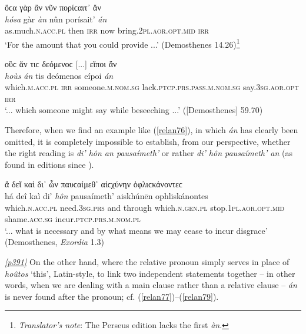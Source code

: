 \begin{exe}
\ex ὅϲα γὰρ ἂν νῦν πορίϲαιτ᾽ ἄν\\
\gll \emph{hósa} gàr \emph{àn} nûn porísait' \emph{án}\\
as.much.\textsc{n.acc.pl} then \textsc{irr} now bring.\textsc{2pl.aor.opt.mid} \textsc{irr}\\
\trans `For the amount that you could provide ...' (Demosthenes 14.26)\footnote{\emph{Translator's note}: The Perseus edition lacks the first \textit{àn}.}
\label{anan2}
\end{exe}

\begin{exe}
\ex οὓϲ ἄν τιϲ δεόμενοϲ {[}...{]} εἴποι ἄν\\
\gll \emph{hoùs} \emph{án} tis deómenos eípoi \emph{án}\\
which.\textsc{m.acc.pl} \textsc{irr} someone.\textsc{m.nom.sg} lack.\textsc{ptcp.prs.pass.m.nom.sg} say.\textsc{3sg.aor.opt} \textsc{irr}\\
\trans `... which someone might say while beseeching ...' ({[}Demosthenes{]} 59.70)
\label{anan3}
\end{exe}

Therefore, when we find an example like (\ref{relan76}), in which \emph{án} has clearly been omitted, it is completely impossible to establish, from our perspective, whether the right reading is \textit{di' hôn \emph{an} pausaímeth'} or rather \textit{di' hôn pausaímeth' \emph{an}} (as found in editions since \citealp[1539]{Bekker1823}).

\begin{exe}
\ex ἅ δεῖ καὶ δι᾽ ὧν παυϲαίμεθ᾽ αἰϲχύνην ὀφλιϲκάνοντεϲ\\
\gll há deî kaì di' \emph{hôn} pausaímeth' aiskhúnēn ophliskánontes\\
which.\textsc{n.acc.pl} need.\textsc{3sg.prs} and through which.\textsc{n.gen.pl} stop.\textsc{1pl.aor.opt.mid} shame.\textsc{acc.sg} incur.\textsc{ptcp.prs.m.nom.pl}\\
\trans `... what is necessary and by what means we may cease to incur disgrace' (Demosthenes, \textit{Exordia} 1.3)
\label{relan76}
\end{exe}

\hyperlink{p391}{\emph{[p391]}} On the other hand, where the relative pronoun simply serves in place of \emph{hoûtos} `this', Latin-style, to link two independent statements together -- in other words, when we are dealing with a main clause rather than a relative clause -- \emph{án} is never found after the pronoun; cf. (\ref{relan77})--(\ref{relan79}).


